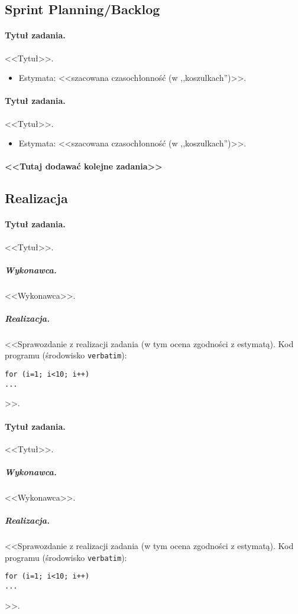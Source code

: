 \documentclass[a4paper]{article}
\begin{document}
\subsection{Sprint Planning/Backlog}

\paragraph{Tytuł zadania.} <<Tytuł>>.
\begin{itemize}
\item Estymata: <<szacowana czasochłonność (w ,,koszulkach'')>>.
\end{itemize}

\paragraph{Tytuł zadania.} <<Tytuł>>.
\begin{itemize}
\item Estymata: <<szacowana czasochłonność (w ,,koszulkach'')>>.
\end{itemize}

\paragraph{<<Tutaj dodawać kolejne zadania>>}

\subsection{Realizacja} %

\paragraph{Tytuł zadania.} <<Tytuł>>.
\subparagraph{Wykonawca.} <<Wykonawca>>.
\subparagraph{Realizacja.} <<Sprawozdanie z realizacji zadania (w tym ocena zgodności z estymatą). Kod programu (środowisko \texttt{verbatim}): \begin{verbatim}
for (i=1; i<10; i++)
...
\end{verbatim}>>.

\paragraph{Tytuł zadania.} <<Tytuł>>.
\subparagraph{Wykonawca.} <<Wykonawca>>.
\subparagraph{Realizacja.} <<Sprawozdanie z realizacji zadania (w tym ocena zgodności z estymatą). Kod programu (środowisko \texttt{verbatim}): \begin{verbatim}
for (i=1; i<10; i++)
...
\end{verbatim}>>.
\end{document}
